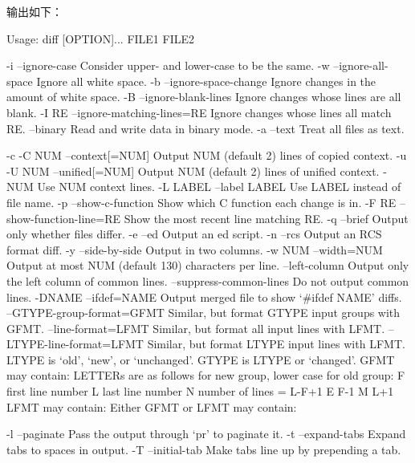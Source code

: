 输出如下：
\begin{textcode}
Usage: diff [OPTION]... FILE1 FILE2

  -i  --ignore-case  Consider upper- and lower-case to be the same.
  -w  --ignore-all-space  Ignore all white space.
  -b  --ignore-space-change  Ignore changes in the amount of white space.
  -B  --ignore-blank-lines  Ignore changes whose lines are all blank.
  -I RE  --ignore-matching-lines=RE  Ignore changes whose lines all match RE.
  --binary  Read and write data in binary mode.
  -a  --text  Treat all files as text.

  -c  -C NUM  --context[=NUM]  Output NUM (default 2) lines of copied context.
  -u  -U NUM  --unified[=NUM]  Output NUM (default 2) lines of unified context.
    -NUM  Use NUM context lines.
    -L LABEL  --label LABEL  Use LABEL instead of file name.
    -p  --show-c-function  Show which C function each change is in.
    -F RE  --show-function-line=RE  Show the most recent line matching RE.
  -q  --brief  Output only whether files differ.
  -e  --ed  Output an ed script.
  -n  --rcs  Output an RCS format diff.
  -y  --side-by-side  Output in two columns.
    -w NUM  --width=NUM  Output at most NUM (default 130) characters per line.
    --left-column  Output only the left column of common lines.
    --suppress-common-lines  Do not output common lines.
  -DNAME  --ifdef=NAME  Output merged file to show `#ifdef NAME' diffs.
  --GTYPE-group-format=GFMT  Similar, but format GTYPE input groups with GFMT.
  --line-format=LFMT  Similar, but format all input lines with LFMT.
  --LTYPE-line-format=LFMT  Similar, but format LTYPE input lines with LFMT.
    LTYPE is `old', `new', or `unchanged'.  GTYPE is LTYPE or `changed'.
    GFMT may contain:
        LETTERs are as follows for new group, lower case for old group:
          F  first line number
          L  last line number
          N  number of lines = L-F+1
          E  F-1
          M  L+1
    LFMT may contain:
    Either GFMT or LFMT may contain:

  -l  --paginate  Pass the output through `pr' to paginate it.
  -t  --expand-tabs  Expand tabs to spaces in output.
  -T  --initial-tab  Make tabs line up by prepending a tab.


\end{textcode}
